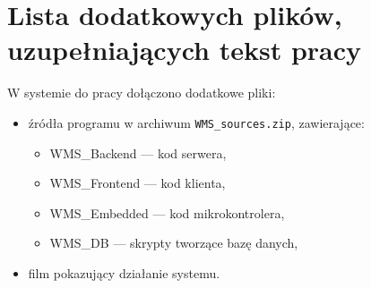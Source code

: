 \chapter{Lista dodatkowych plików, uzupełniających tekst pracy}



W systemie do pracy dołączono dodatkowe pliki:
\begin{itemize}
    \item źródła programu w archiwum \texttt{WMS\_sources.zip}, zawierające:
          \begin{itemize}
              \item WMS\_Backend --- kod serwera,
              \item WMS\_Frontend --- kod klienta,
              \item WMS\_Embedded --- kod mikrokontrolera,
              \item WMS\_DB --- skrypty tworzące bazę danych,
          \end{itemize}
    \item film pokazujący działanie systemu.
\end{itemize}
